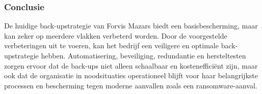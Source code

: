 \subsubsection{Conclusie}
De huidige back-upstrategie van Forvis Mazars biedt een basisbescherming, maar kan zeker op meerdere vlakken verbeterd worden. Door de voorgestelde verbeteringen uit te voeren, kan het bedrijf een veiligere en optimale back-upstrategie hebben. Automatisering, beveiliging, redundantie en hersteltesten zorgen ervoor dat de back-ups niet alleen schaalbaar en kostenefficiënt zijn, maar ook dat de organisatie in noodsituaties operationeel blijft voor haar belangrijkste processen en bescherming tegen moderne aanvallen zoals een ransomware-aanval.







